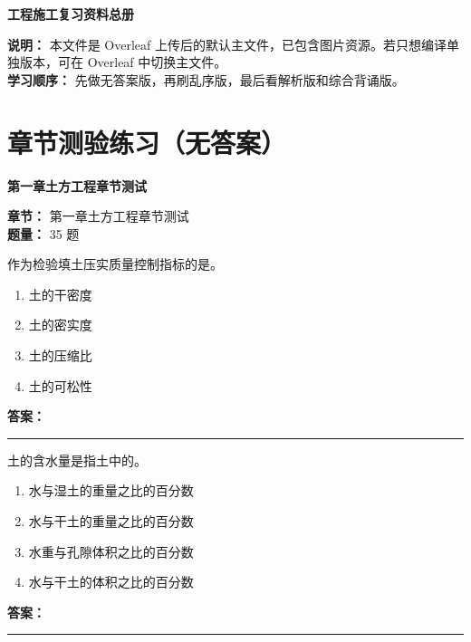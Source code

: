\documentclass[UTF8,fontset=fandol,11pt]{ctexart}
\newcommand{\chaptertitle}[1]{\vspace{0.5em}\begin{tcolorbox}[enhanced,colback=deepblue,colframe=deepblue,arc=2mm,boxrule=0pt]\begin{center}\Large\bfseries\color{white}#1\end{center}\end{tcolorbox}\vspace{0.5em}}
\newcommand{\answerline}{\textcolor{answerred}{\rule{2.4cm}{0.7pt}}}
\begin{document}
\chaptertitle{工程施工复习资料总册}

\begin{reviewbox}[title={使用说明}]

\textbf{说明：} 本文件是 Overleaf 上传后的默认主文件，已包含图片资源。若只想编译单独版本，可在 Overleaf 中切换主文件。\\

\textbf{学习顺序：} 先做无答案版，再刷乱序版，最后看解析版和综合背诵版。

\end{reviewbox}

\tableofcontents

\newpage

\section*{章节测验练习（无答案）}


\chaptertitle{第一章土方工程章节测试}
\begin{mainbox}
\textbf{\textcolor{mainblue}{章节：}} 第一章土方工程章节测试\\
\textbf{\textcolor{answerred}{题量：}} 35 题
\end{mainbox}

\begin{quizbox}[title={第 1 题}]
作为检验填土压实质量控制指标的是。\\
\begin{enumerate}[label=\Alph*.]
\item 土的干密度
\item 土的密实度
\item 土的压缩比
\item 土的可松性
\end{enumerate}
\textbf{\textcolor{answerred}{答案：}} \answerline
\end{quizbox}

\begin{quizbox}[title={第 2 题}]
土的含水量是指土中的。\\
\begin{enumerate}[label=\Alph*.]
\item 水与湿土的重量之比的百分数
\item 水与干土的重量之比的百分数
\item 水重与孔隙体积之比的百分数
\item 水与干土的体积之比的百分数
\end{enumerate}
\textbf{\textcolor{answerred}{答案：}} \answerline
\end{quizbox}
\end{document}
